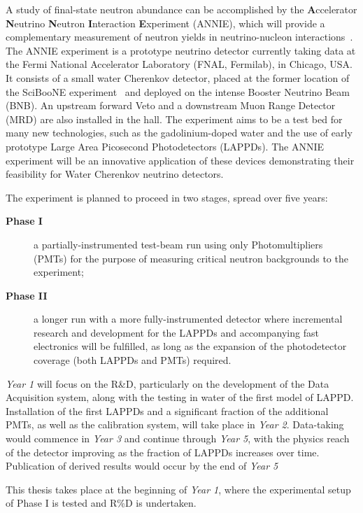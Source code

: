  A study of final-state neutron abundance can be accomplished by the %
 \textbf{A}ccelerator \textbf{N}eutrino \textbf{N}eutron \textbf{I}nteraction \textbf{E}xperiment %
 (ANNIE), which will provide a complementary measurement of neutron yields in %
 neutrino-nucleon interactions~\cite{Anghel2014a}.
 The ANNIE experiment is a prototype neutrino detector currently taking data at the %
 Fermi National Accelerator Laboratory (FNAL, Fermilab), in Chicago, USA.
 It consists of a small water Cherenkov detector, placed at the former location of %
 the SciBooNE experiment~\cite{Nakajima2011} and deployed on the intense Booster Neutrino Beam (BNB).
 An upstream forward Veto and a downstream Muon Range Detector (MRD) are also installed %
 in the hall.
 The experiment aims to be a test bed for many new technologies, such as the gadolinium-doped water %
 and the use of early prototype Large Area Picosecond Photodetectors (LAPPDs).
 The ANNIE experiment will be an innovative application of these devices demonstrating %
 their feasibility for Water Cherenkov neutrino detectors.
 
 The experiment is planned to proceed in two stages, spread over five years:
 \begin{description}
   \item[\bfseries Phase I] a partially-instrumented test-beam run using only Photomultipliers %
     (PMTs) for the purpose of measuring critical neutron backgrounds to the experiment;
   \item[\bfseries Phase II] a longer run with a more fully-instrumented detector %
     where incremental research and development for the LAPPDs and %
     accompanying fast electronics will be fulfilled, as long as the expansion of the %
     photodetector coverage (both LAPPDs and PMTs) required.
 \end{description}

 \emph{Year 1} will focus on the R\&D, particularly on the development of the Data Acquisition %
 system, along with the testing in water of the first model of LAPPD. 
 Installation of the first LAPPDs and a significant fraction of the additional PMTs, as %
 well as the calibration system, will take place in \emph{Year 2}.
 Data-taking would commence in \emph{Year 3} and continue through \emph{Year 5}, %
 with the physics reach of the detector improving as the fraction of LAPPDs increases over time.
 Publication of derived results would occur by the end of \emph{Year 5}~\cite{Anghel2014}
 
 This thesis takes place at the beginning of \emph{Year 1}, where the experimental setup of Phase I %
 is tested and R\%D is undertaken.

